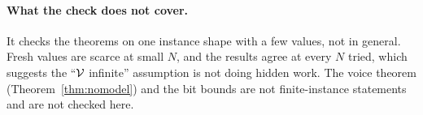 \paragraph{What the check does not cover.} It checks the theorems on one instance shape with a few
values, not in general. Fresh values are scarce at small $N$, and the results agree at every
$N$ tried, which suggests the ``$\mathcal{V}$ infinite'' assumption is not doing hidden work. The voice
theorem (Theorem~\ref{thm:nomodel}) and the bit bounds are not finite-instance statements and are
not checked here.
